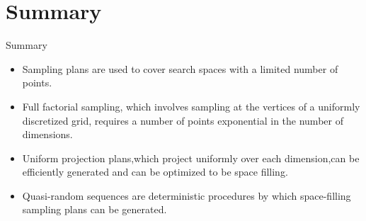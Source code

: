 \documentclass{beamer}
\begin{document}
\section{Summary}
\begin{frame}{Summary}
    \begin{itemize}
        \item Sampling plans are used to cover search spaces with a limited number of points.
        \item Full factorial sampling, which involves sampling at the vertices of a uniformly discretized grid, requires a number of points exponential in the number of dimensions.
        \item Uniform projection plans,which project uniformly over each dimension,can be efficiently generated and can be optimized to be space filling.
        \item Quasi-random sequences are deterministic procedures by which space-filling sampling plans can be generated.
    \end{itemize}
    
\end{frame}
\end{document}
